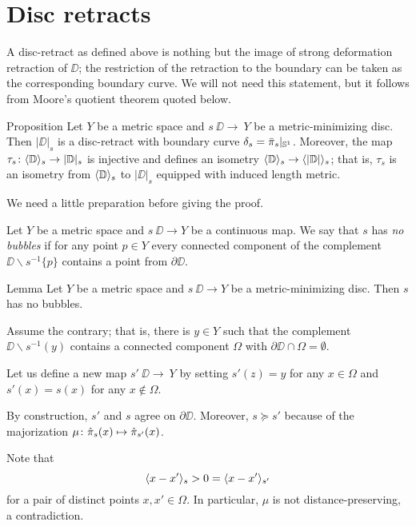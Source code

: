 \section{Disc retracts}\label{Metric-minimizing discs}

A disc-retract as defined above is nothing but the image of strong deformation retraction of $\DD$;
the restriction of the retraction to the boundary can be taken as the corresponding boundary curve.
We will not need this statement, but it follows from Moore's quotient theorem quoted below. 

\begin{thm}{Proposition}\label{prop:|D|}
Let $Y$ be a metric space and $s\:\DD\to\ Y$ be a metric-minimizing disc.
Then $|\DD|_s$ is a disc-retract with boundary curve $\delta_s=\bar\pi_s|_{\mathbb{S}^1}$.
Moreover, the map $\tau_s\colon\langle\mathbb{D}\rangle_s\to |\mathbb{D}|_s$ is injective and defines an isometry
$\<\DD\>_s\zz\to \<|\DD|\>_s$;
that is, $\tau_s$ is an isometry from $\langle\mathbb{D}\rangle_s$ to $|\DD|_s$ equipped with induced length metric.
\end{thm}

We need a little preparation before giving the proof.

Let $Y$ be a metric space and
$s\:\DD\to Y$ be a continuous map.
We say that $s$ has \label{page:no-bubble}\emph{no bubbles}
if for any point $p\in Y$ every connected component of the complement $\DD\backslash s^{-1}\{p\}$ contains a point from $\partial \DD$.

\begin{thm}{Lemma}\label{prop:point-complement}
Let $Y$ be a metric space and $s\:\DD\to Y$ be a metric-minimizing disc.
Then $s$ has no bubbles.
\end{thm}

Assume the contrary;
that is, there is $y\in Y$ such that the complement $\DD\backslash s^{-1}(y)$ contains a connected component $\Omega$ with $\partial \DD\cap \Omega=\emptyset$.

Let us define a new map $s'\:\DD\to\ Y$ by setting $s'(z)=y$ for any $x\in \Omega$ and $s'(x)=s(x)$ for any $x\notin \Omega$.

By construction, $s'$ and $s$ agree on $\partial\DD$. Moreover, $s\succcurlyeq s'$
because of the majorization $\mu\:\hat\pi_s(x)\zz\mapsto \hat\pi_{s'}(x)$.

Note that
\[\langle x-x'\rangle_{s}>0=\langle x-x'\rangle_{s'}\]
for a pair of distinct points $x,x'\in \Omega$.
In particular, $\mu$ is not distance-preserving, a contradiction.
\qeds



